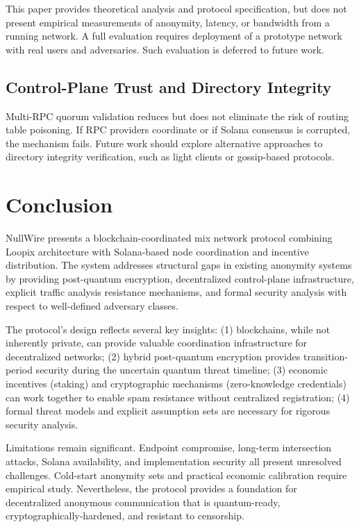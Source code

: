 \documentclass[11pt]{article}
\theoremstyle{definition}
\theoremstyle{remark}
\begin{document}
This paper provides theoretical analysis and protocol specification, but does not present empirical measurements of anonymity, latency, or bandwidth from a running network. A full evaluation requires deployment of a prototype network with real users and adversaries. Such evaluation is deferred to future work.

\subsection{Control-Plane Trust and Directory Integrity}

Multi-RPC quorum validation reduces but does not eliminate the risk of routing table poisoning. If RPC providers coordinate or if Solana consensus is corrupted, the mechanism fails. Future work should explore alternative approaches to directory integrity verification, such as light clients or gossip-based protocols.

\section{Conclusion}
\label{sec:conclusion}

NullWire presents a blockchain-coordinated mix network protocol combining Loopix architecture with Solana-based node coordination and incentive distribution. The system addresses structural gaps in existing anonymity systems by providing post-quantum encryption, decentralized control-plane infrastructure, explicit traffic analysis resistance mechanisms, and formal security analysis with respect to well-defined adversary classes.

The protocol's design reflects several key insights: (1) blockchains, while not inherently private, can provide valuable coordination infrastructure for decentralized networks; (2) hybrid post-quantum encryption provides transition-period security during the uncertain quantum threat timeline; (3) economic incentives (staking) and cryptographic mechanisms (zero-knowledge credentials) can work together to enable spam resistance without centralized registration; (4) formal threat models and explicit assumption sets are necessary for rigorous security analysis.

Limitations remain significant. Endpoint compromise, long-term intersection attacks, Solana availability, and implementation security all present unresolved challenges. Cold-start anonymity sets and practical economic calibration require empirical study. Nevertheless, the protocol provides a foundation for decentralized anonymous communication that is quantum-ready, cryptographically-hardened, and resistant to censorship.
\end{document}
